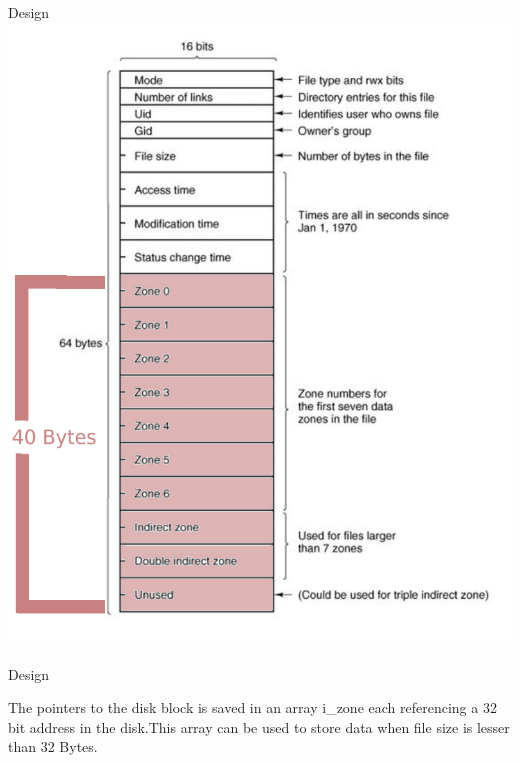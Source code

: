 \documentclass{beamer}
\begin{document}
%
\begin{frame}{Design}
\center \includegraphics[scale=0.33]{inode.jpg} 
\end{frame}


%

\begin{frame}{Design}
\begin{tiny}

\end{tiny}

The pointers to the disk block is saved in an array i\_zone each referencing a 32 bit address in the disk.This array can be used to store data when file size is lesser than 32 Bytes. 
\end{frame}

\end{document}
